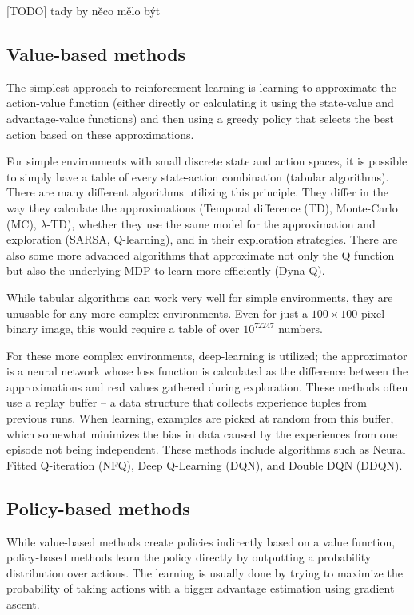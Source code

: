 \documentclass[
  digital,     %
  oneside,     %
  nosansbold,  %
  nocolorbold, %
  lof,         %
  lot,         %
]{fithesis4}
\begin{document}
[TODO] tady by něco mělo být

\subsection{Value-based methods}

The simplest approach to reinforcement learning is learning to approximate the action-value function (either directly or calculating it using the state-value and advantage-value functions) and then using a greedy policy that selects the best action based on these approximations.

For simple environments with small discrete state and action spaces, it is possible to simply have a table of every state-action combination (tabular algorithms). There are many different algorithms utilizing this principle. They differ in the way they calculate the approximations (Temporal difference (TD), Monte-Carlo (MC), $\lambda$-TD), whether they use the same model for the approximation and exploration (SARSA, Q-learning), and in their exploration strategies. There are also some more advanced algorithms that approximate not only the Q function but also the underlying MDP to learn more efficiently (Dyna-Q).

While tabular algorithms can work very well for simple environments, they are unusable for any more complex environments. Even for just a $100 \times 100$ pixel binary image, this would require a table of over $10^{72247}$ numbers.

For these more complex environments, deep-learning is utilized; the approximator is a neural network whose loss function is calculated as the difference between the approximations and real values gathered during exploration. These methods often use a replay buffer -- a data structure that collects experience tuples from previous runs. When learning, examples are picked at random from this buffer, which somewhat minimizes the bias in data caused by the experiences from one episode not being independent. These methods include algorithms such as Neural Fitted Q-iteration (NFQ), Deep Q-Learning (DQN), and Double DQN (DDQN).

\subsection{Policy-based methods}

While value-based methods create policies indirectly based on a value function, policy-based methods learn the policy directly by outputting a probability distribution over actions. The learning is usually done by trying to maximize the probability of taking actions with a bigger advantage estimation using gradient ascent.
\end{document}
